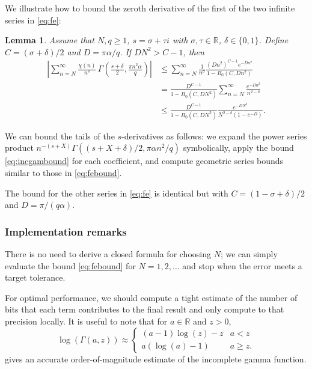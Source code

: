 \documentclass[reqno]{amsart}
\newcommand{\RR}{\mathbb{R}}
\newcommand{\be}{\begin{equation}}
\newcommand{\ee}{\end{equation}}
\newtheorem{lemma}[theorem]{Lemma}
\theoremstyle{definition}
\begin{document}

We illustrate how to bound the zeroth derivative
of the first of the two infinite series in \eqref{eq:fe}:
\begin{lemma}
Assume that $N, q \ge 1$, $s = \sigma + \tau i$ with $\sigma, \tau \in \RR$, $\delta \in \{0,1\}$.
Define $C = (\sigma + \delta)/2$ and $D = \pi \alpha / q$.
If $D N^2 > C - 1$, then
\begin{equation}
\label{eq:febound}
\begin{aligned}
\left|\sum_{n=N}^{\infty} \frac{\chi(n)}{n^s} \, \Gamma\!\left(\frac{s+\delta}{2}, \frac{\pi n^2 \alpha}{q}\right) \right|
& \le \sum_{n=N}^{\infty} \frac{1}{n^{\sigma}} \frac{(D n^2)^{C-1} e^{-D n^2}}{1-B_0(C, D n^2)} \\
& = \frac{D^{C-1}}{1-B_0(C, D N^2)} \sum_{n=N}^{\infty} \frac{e^{-D n^2}}{n^{2-\delta}} \\
& \le \frac{D^{C-1}}{1-B_0(C, D N^2)} \frac{e^{-D N^2}}{N^{2-\delta} (1-e^{-D})}.
\end{aligned}
\end{equation}
\end{lemma}

We can bound the tails of the $s$-derivatives
as follows: we expand
the power series product $n^{-(s+X)} \Gamma((s+X+\delta)/2, \pi \alpha n^2/q)$ symbolically,
apply the bound \eqref{eq:incgambound} for each coefficient, and
compute geometric series bounds similar to those in \eqref{eq:febound}.

The bound for the other series in \eqref{eq:fe} is identical but
with $C = (1 - \sigma + \delta)/2$ and $D = \pi / (q \alpha)$.

\subsubsection{Implementation remarks}

There is no need to derive a closed formula for choosing $N$;
we can simply evaluate the bound \eqref{eq:febound} for $N = 1, 2, \ldots$ and stop
when the error meets a target tolerance.

For optimal performance, we should compute a tight estimate of the number of bits
that each term contributes to the final result and only compute
to that precision locally.
It is useful to note that for $a \in \RR$ and $z > 0$,
\be
\log(\Gamma(a,z)) \approx \begin{cases} (a-1) \log(z) - z & a < z \\ a (\log(a) - 1) & a \ge z. \end{cases}
\ee
gives an accurate order-of-magnitude
estimate of the incomplete gamma function.
\end{document}
